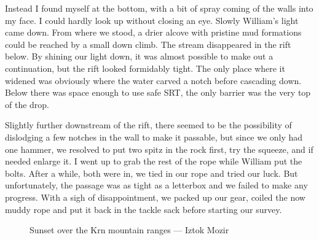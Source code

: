 Instead I found myself at the bottom, with a bit of spray coming of the walls into my face. I could hardly look up without closing an eye. Slowly William's light came down. From where we stood, a drier alcove with pristine mud formations could be reached by a small down climb. The stream disappeared in the rift below. By shining our light down, it was almost possible to make out a continuation, but the rift looked formidably tight. The only place where it widened was obviously where the water carved a notch before cascading down. Below there was space enough to use safe SRT, the only barrier was the very top of the drop.

Slightly further downstream of the rift, there seemed to be the possibility of dislodging a few notches in the wall to make it passable, but since we only had one hammer, we resolved to put two spitz in the rock first, try the squeeze, and if needed enlarge it. I went up to grab the rest of the rope while William put the bolts. After a while, both were in, we tied in our rope and tried our luck. But unfortunately, the passage was as tight as a letterbox and we failed to make any progress. With a sigh of disappointment, we packed up our gear, coiled the now muddy rope and put it back in the tackle sack before starting our survey. 

\begin{figure}[b!]
\centering
{}
\caption{Sunset over the Krn mountain ranges --- Iztok Mozir}
\label{SS2014}
\end{figure}